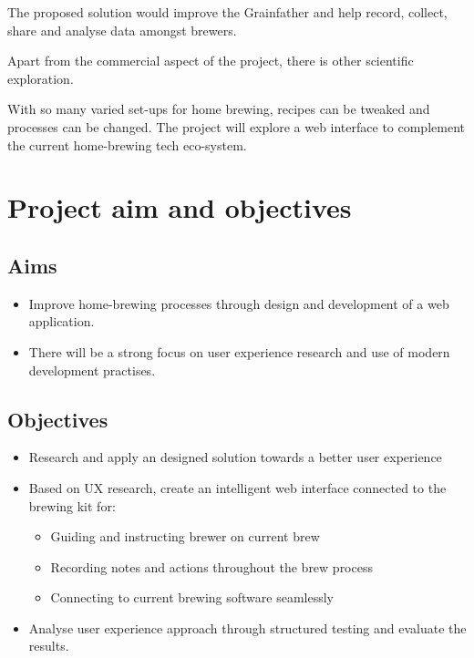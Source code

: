 The proposed solution would improve the Grainfather and help record, collect, share and analyse data amongst brewers.

Apart from the commercial aspect of the project, there is other scientific exploration.

With so many varied set-ups for home brewing, recipes can be tweaked and processes can be changed. The project will explore a web interface to complement the current home-brewing tech eco-system.

\section{Project aim and objectives}

    \subsection{Aims}

        \begin{itemize}
            \item Improve home-brewing processes through design and development of a web application.
            \item There will be a strong focus on user experience research and use of modern development practises.
        \end{itemize}

    \subsection{Objectives}

        \begin{itemize}
            \item Research and apply an designed solution towards a better user experience
            \item Based on UX research, create an intelligent web interface connected to the brewing kit for:
                \begin{itemize}
                    \item Guiding and instructing brewer on current brew
                    \item Recording notes and actions throughout the brew process
                    \item Connecting to current brewing software seamlessly
                \end{itemize}
            \item Analyse user experience approach through structured testing and evaluate the results.
        \end{itemize}

